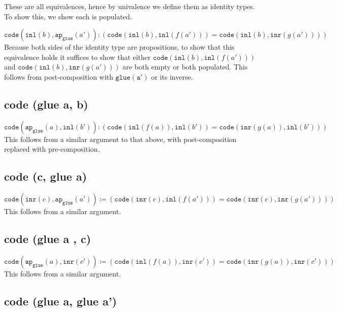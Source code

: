 \documentclass[12pt]{amsart}
\newcommand{\type}[1]{\mathtt{#1}}
\newcommand{\inl}{\type{inl}}
\newcommand{\inr}{\type{inr}}
\theoremstyle{remark}
\theoremstyle{definition}
\begin{document}
These are all equivalences, hence by univalence
we define them as identity types. 
To show this, we show each is populated.

	$ 
	\type{ code } \left( \inl( b ) , \type{ ap }_{ \type{ glue } } ( a' ) \right) \colon \left( \type{ code } ( \inl( b ) , \inl( f ( a' ) ) ) = \type{ code } ( \inl( b ) , \inr( g ( a' ) ) ) \right) 
	$
	Because both sides of the identity type are propositions,
	to show that this equivalence holds
	it suffices to show that either
	$\type{ code } ( \inl( b ) , \inl( f ( a' ) ) )$
	and
	$\type{ code } ( \inl( b ) , \inr( g ( a' ) ) )$
	are both empty or both populated.
	This follows from post-composition with
	$ \type{ glue ( a' ) }$
	or its inverse.	

\pagebreak
\subsection*{code (glue a, b)}

	$ 
	\type{ code } \left( \type{ ap }_{ \type{ glue } } ( a ) , \inl( b' ) \right) \colon
	\left(
	\type{ code } ( \inl( f ( a ) ) , \inl( b' ) ) =
	\type{ code } ( \inr( g ( a ) ), \inl( b' ) ) 
	\right)
	$
	This follows from a similar argument to that above, 
	with post-composition replaced with pre-composition.

\pagebreak
\subsection*{code (c, glue a)}

	$ 
	\type{ code } \left( \inr( c ) , \type{ ap }_{ \type{ glue } } ( a' ) \right) \coloneqq
	\left( 
	\type{ code } ( \inr( c ) , \inl( f ( a' ) ) ) =
	\type{ code } ( \inr( c ) , \inr( g ( a' ) ) ) 
	\right) 
	$ 
	This follows from a similar argument.	

\pagebreak
\subsection*{code (glue a , c)}

	$ 
	\type{ code } \left( \type{ ap }_{ \type{ glue } } ( a ) , \inr( c' ) \right) \coloneqq 
	\left( 
	\type{ code } ( \inl( f ( a ) ) , \inr( c' ) ) =
	\type{ code } ( \inr( g ( a ) ) , \inr( c' ) ) 
	\right) 
	$ 
	This follows from a similar argument.	

\pagebreak
\subsection*{code (glue a, glue a')}
\end{document}
